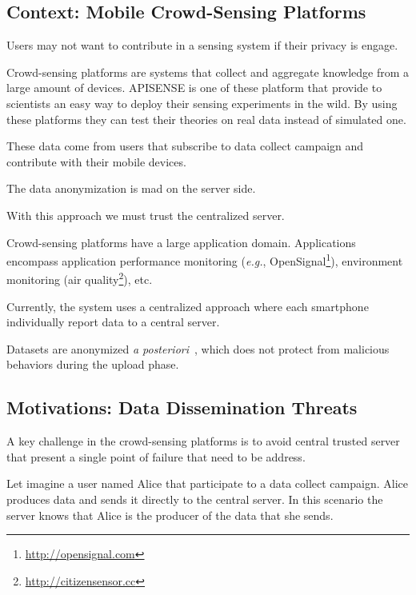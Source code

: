 \subsection{Context: Mobile Crowd-Sensing Platforms}





Users may not want to contribute in a sensing system if their privacy is engage.

Crowd-sensing platforms are systems that collect and aggregate knowledge from a large amount of devices.
APISENSE is one of these platform that provide to scientists an easy way to deploy their sensing experiments in the wild. By using these platforms they can test their theories on real data instead of simulated one.



These data come from users that subscribe to data collect campaign and contribute with their mobile devices.





The data anonymization is mad on the server side.

With this approach we must trust the centralized server.


Crowd-sensing platforms have a large application domain.
Applications encompass application performance monitoring (\emph{e.g.}, OpenSignal\footnote{\url{http://opensignal.com}}), environment monitoring (air quality\footnote{\url{http://citizensensor.cc}}), etc.


Currently, the system uses a centralized approach where each smartphone individually report data to a central server.

Datasets are anonymized \emph{a posteriori}~\cite{DBLP:conf/icdcs/PrimaultMB15}, which does not protect from malicious behaviors during the upload phase.

\subsection{Motivations: Data Dissemination Threats}

A key challenge in the crowd-sensing platforms is to avoid central trusted server that present a single point of failure that need to be address.

Let imagine a user named Alice that participate to a data collect campaign.
Alice produces data and sends it directly to the central server.
In this scenario the server knows that Alice is the producer of the data that she sends.

